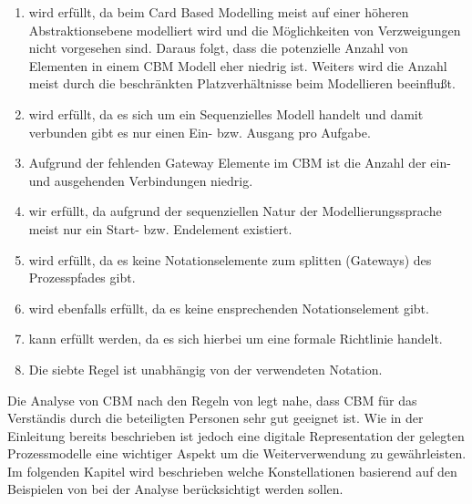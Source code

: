 \begin{enumerate}
	\item wird erfüllt, da beim Card Based Modelling meist auf einer höheren Abstraktionsebene modelliert wird und die Möglichkeiten von Verzweigungen nicht vorgesehen sind. Daraus folgt, dass die potenzielle Anzahl von Elementen in einem CBM Modell eher niedrig ist. Weiters wird die Anzahl meist durch die beschränkten Platzverhältnisse beim Modellieren beeinflußt. 
	\item wird erfüllt, da es sich um ein Sequenzielles Modell handelt und damit verbunden gibt es nur einen Ein- bzw. Ausgang pro Aufgabe.
	\item Aufgrund der fehlenden Gateway Elemente im CBM ist die Anzahl der ein- und ausgehenden Verbindungen niedrig. 
	\item wir erfüllt, da aufgrund der sequenziellen Natur der Modellierungssprache meist nur ein Start- bzw. Endelement existiert.
	\item wird erfüllt, da es keine Notationselemente zum splitten (Gateways) des Prozesspfades gibt. 
	\item wird ebenfalls erfüllt, da es keine ensprechenden Notationselement gibt. 
	\item kann erfüllt werden, da es sich hierbei um eine formale Richtlinie handelt.
	\item Die siebte Regel ist unabhängig von der verwendeten Notation.
\end{enumerate}

Die Analyse von CBM nach den Regeln von \citet{MENDLING2010127} legt nahe, dass CBM für das Verständis durch die beteiligten Personen sehr gut geeignet ist. Wie in der Einleitung bereits beschrieben ist jedoch eine digitale Representation der gelegten Prozessmodelle eine wichtiger Aspekt um die Weiterverwendung zu gewährleisten. Im folgenden Kapitel wird beschrieben welche Konstellationen basierend auf den Beispielen von \citet{max} bei der Analyse berücksichtigt werden sollen.

